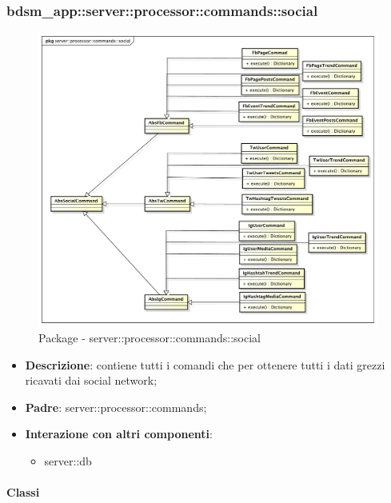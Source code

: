       \subsubsection{bdsm\_app::server::processor::commands::social} %
      \label{ssub:bdsm_app_server_processor_commands_social}
      \begin{figure}[!htbp]
      	\centering
      	\centerline{\includegraphics[scale=0.4]{./images/server/social.pdf}}
      	\caption{Package - server::processor::commands::social}
      \end{figure}

      \begin{itemize}
        \item \textbf{Descrizione}: contiene tutti i comandi che per ottenere tutti i dati grezzi ricavati dai social network;
        \item \textbf{Padre}: server::processor::commands;
        \item \textbf{Interazione con altri componenti}:
          \begin{itemize}
            \item server::db
          \end{itemize}
      \end{itemize}

        \paragraph{Classi} %

